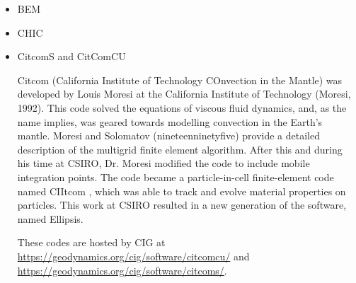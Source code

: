 \begin{itemize}
\begin{scriptsize}
\cite{bokj08}
\cite{llor19}
\end{scriptsize}

\item {\codefont BEM}   

\begin{scriptsize}
\cite{crsr83}
\cite{katl95}
\cite{moct07}
\cite{moct09}
\cite{moyb10}
\cite{qumm12}\cite{buqm12}
\cite{quhm13}
\cite{gert19}
\end{scriptsize}

\item {\codefont CHIC}  

\begin{scriptsize}
\cite{norv15}
\end{scriptsize}

\item {\codefont CitcomS} and {\codefont CitComCU} 

Citcom (California Institute of Technology COnvection in the Mantle) was  developed by Louis
Moresi at the California Institute of Technology (Moresi, 1992). This code solved the equations
of viscous fluid dynamics, and, as the name implies, was geared towards modelling convection in
the Earth’s mantle. Moresi and Solomatov (nineteenninetyfive) provide a detailed description of the multigrid
finite element algorithm. After this and during his time at CSIRO, Dr. Moresi modified the code to
include mobile integration points. The code became a particle-in-cell finite-element code named
CIItcom , which was able to track and evolve material properties on particles. This work at
CSIRO resulted in a new generation of the software, named Ellipsis.

These codes are hosted by CIG at \url{https://geodynamics.org/cig/software/citcomcu/}
and \url{https://geodynamics.org/cig/software/citcoms/}.


\end{itemize}
